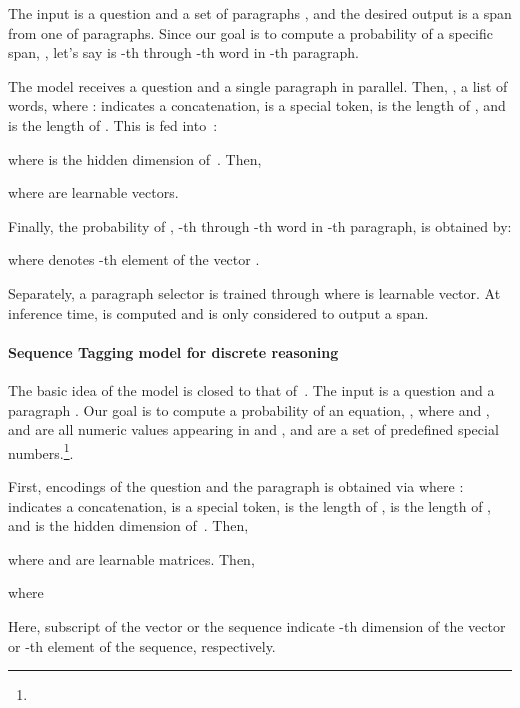\documentclass[11pt,a4paper]{article}
\begin{document}
The input is a question  and a set of paragraphs , and the desired output is a span from one of paragraphs. Since our goal is to compute a probability of a specific span, , let's say  is -th through -th word in -th paragraph.

The model receives a question  and a single paragraph  in parallel. Then, , a list of  words, where : indicates a concatenation,  is a special token,  is the length of , and  is the length of . This  is fed into~\bert:

where  is the hidden dimension of~\bert. Then, 

where  are learnable vectors.

Finally, the probability of , -th through -th word in -th paragraph, is obtained by:

where  denotes -th element of the vector .

Separately, a paragraph selector is trained through  where  is learnable vector. At inference time,  is computed and  is only considered to output a span.




\paragraph{Sequence Tagging model for discrete reasoning}
The basic idea of the model is closed to that of~\citet{drop}.
The input is a question  and a paragraph . Our goal is to compute a probability of an equation, , where  and ,  and  are all numeric values appearing in  and , and  are a set of predefined special numbers.\footnote{}.

First, \bert{} encodings of the question and the paragraph is obtained via 
where : indicates a concatenation,  is a special token,  is the length of ,  is the length of , and  is the hidden dimension of~\bert. Then, 

where  and  are learnable matrices. Then,

where

Here, subscript  of the vector or the sequence indicate -th dimension of the vector or -th element of the sequence, respectively.
\end{document}
